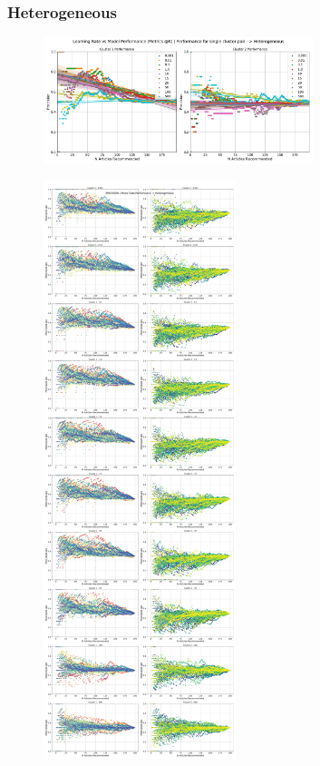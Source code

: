 \documentclass[a4paper,fontsize=8.0pt]{scrartcl}
\begin{document}
\subsubsection{Heterogeneous}
\begin{figure}[H]
    \includegraphics[width=0.7\textwidth]{Graphs/GLOVE/lr_vs_model_performance_single_mixed_Heterogeneous.pdf}
\end{figure}
\newpage
\begin{figure}[H]
    \includegraphics[width=0.5\textwidth]{Graphs/GLOVE/lr_vs_model_performance_precision_all_cps_mixed_data_sep_Heterogeneous.pdf}
\end{figure}
\end{document}
